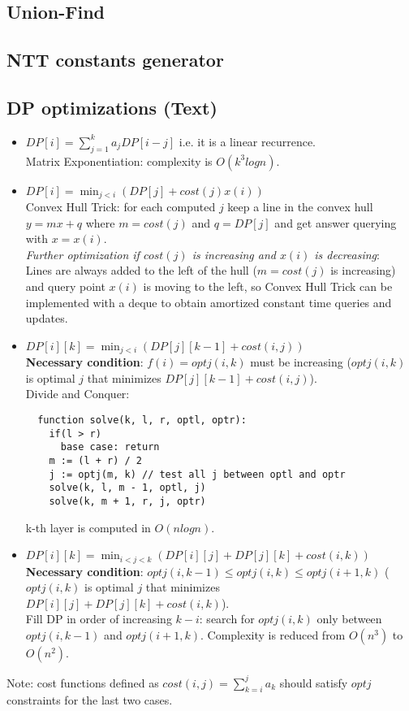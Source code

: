 \documentclass[9pt]{extarticle}
\begin{document}
\begin{multicols*}{3}
\subsection{Union-Find}


\subsection{NTT constants generator}


\subsection{DP optimizations (Text)}
\begin{itemize}
\item $DP[i] = \displaystyle \sum_{j = 1}^{k} a_{j}DP[i - j]$ i.e. it is a linear recurrence. \\
 Matrix Exponentiation: complexity is $O(k^3logn)$.
\item $DP[i] = \displaystyle \min_{j < i} (DP[j] + cost(j)x(i))$ \\
 Convex Hull Trick: for each computed $j$ keep a line in the convex hull $y = mx + q$
 where $m = cost(j)$ and $q = DP[j]$ and get answer querying with $x = x(i)$. \\
 \textit{Further optimization if $cost(j)$ is increasing and $x(i)$ is decreasing}: \\
 Lines are always added to the left of the hull ($m = cost(j)$ is increasing)
 and query point $x(i)$ is moving to the left, so Convex Hull Trick can be
 implemented with a deque to obtain amortized constant time queries and updates.
\item $DP[i][k] = \displaystyle \min_{j < i} (DP[j][k - 1] + cost(i, j))$ \\
 \textbf{Necessary condition}: $f(i) = optj(i, k)$ must be increasing ($optj(i, k)$ is optimal $j$ that minimizes
 $DP[j][k - 1] + cost(i, j)$). \\
 Divide and Conquer:
 \begin{lstlisting}
  function solve(k, l, r, optl, optr):
    if(l > r)
      base case: return
    m := (l + r) / 2
    j := optj(m, k) // test all j between optl and optr
    solve(k, l, m - 1, optl, j)
    solve(k, m + 1, r, j, optr)
 \end{lstlisting}
 k-th layer is computed in $O(nlogn)$.
\item $DP[i][k] = \displaystyle \min_{i < j < k} (DP[i][j] + DP[j][k] + cost(i, k))$ \\
 \textbf{Necessary condition}: $optj(i, k - 1) \leq optj(i, k) \leq optj(i + 1, k)$ ($optj(i, k)$ is optimal $j$ that minimizes
 $DP[i][j] + DP[j][k] + cost(i, k)$). \\
 Fill DP in order of increasing $k - i$: search for $optj(i, k)$ only between $optj(i, k - 1)$ and $optj(i + 1, k)$.
 Complexity is reduced from $O(n^3)$ to $O(n^2)$.
\end{itemize}
Note: cost functions defined as $cost(i, j) = \displaystyle \sum_{k = i}^{j} a_{k}$ should satisfy $optj$ constraints for the last two cases.


\end{multicols*}
\end{document}

